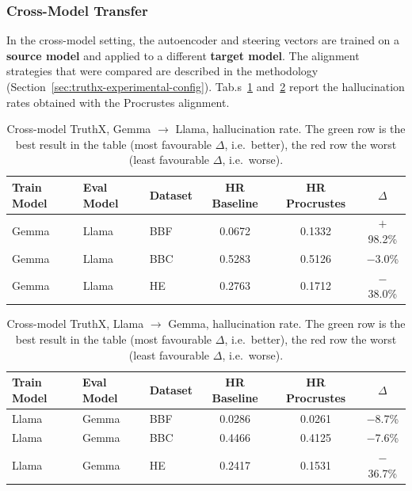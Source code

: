 \subsubsection{Cross-Model Transfer}

In the cross-model setting, the autoencoder and steering vectors are trained on a \textbf{source model} and applied to a different \textbf{target model}. The alignment strategies that were compared are described in the methodology (Section~\ref{sec:truthx-experimental-config}). Tab.s~\ref{tab:truthx-cross-model-gemma-to-llama} and~\ref{tab:truthx-cross-model-llama-to-gemma} report the hallucination rates obtained with the Procrustes alignment.

\begin{table}[H]
\centering
\setlength{\tabcolsep}{4pt}
\begin{tabular}{lllccc}
\toprule
\textbf{Train Model} & \textbf{Eval Model} & \textbf{Dataset} & \textbf{HR Baseline} & \textbf{HR Procrustes} & \textbf{$\Delta$} \\
\midrule
\rowcolor{red!25}Gemma & Llama & BBF & 0.0672 & 0.1332 & $+$98.2\% \\
Gemma & Llama & BBC & 0.5283 & 0.5126 & $-$3.0\% \\
\rowcolor{green!25}Gemma & Llama & HE  & 0.2763 & 0.1712 & $-$38.0\% \\
\bottomrule
\end{tabular}
\caption{Cross-model TruthX, Gemma $\to$ Llama, hallucination rate. The green row is the best result in the table (most favourable $\Delta$, i.e.\ better), the red row the worst (least favourable $\Delta$, i.e.\ worse).}
\label{tab:truthx-cross-model-gemma-to-llama}
\end{table}

\begin{table}[H]
\centering
\setlength{\tabcolsep}{4pt}
\begin{tabular}{lllccc}
\toprule
\textbf{Train Model} & \textbf{Eval Model} & \textbf{Dataset} & \textbf{HR Baseline} & \textbf{HR Procrustes} & \textbf{$\Delta$} \\
\midrule
Llama & Gemma & BBF & 0.0286 & 0.0261 & $-$8.7\% \\
\rowcolor{red!25}Llama & Gemma & BBC & 0.4466 & 0.4125 & $-$7.6\% \\
\rowcolor{green!25}Llama & Gemma & HE  & 0.2417 & 0.1531 & $-$36.7\% \\
\bottomrule
\end{tabular}
\caption{Cross-model TruthX, Llama $\to$ Gemma, hallucination rate. The green row is the best result in the table (most favourable $\Delta$, i.e.\ better), the red row the worst (least favourable $\Delta$, i.e.\ worse).}
\label{tab:truthx-cross-model-llama-to-gemma}
\end{table}

